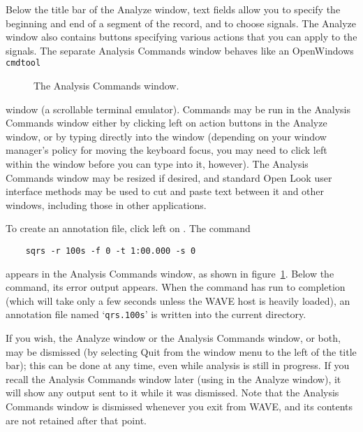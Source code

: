 \documentclass[twoside]{book}
\newcommand{\button}[1]{\cornersize{2}\ovalbox{\rule[-.3mm]{0cm}{2.5mm}\small\sf ~#1~}}
\newcommand{\WAVE}{{\sf WAVE}\xspace}
\begin{document}
Below the title bar of the {\sf Analyze} window, text fields allow you to
specify the beginning and end of a segment of the record, and to
choose signals.  The {\sf Analyze} window also contains buttons specifying
various actions that you can apply to the signals.  The separate
{\sf Analysis Commands} window behaves like an OpenWindows {\tt cmdtool}
\begin{figure}
\centerline{}
\caption{The {\sf Analysis Commands} window.}
\begin{htmlonly}
\end{htmlonly}
\begin{latexonly}
\end{latexonly}
\label{fig:analysis-commands}
\end{figure}
window (a scrollable terminal emulator).  Commands may be run in the
{\sf Analysis Commands} window either by clicking left on action buttons
in the {\sf Analyze} window, or by typing directly into the window (depending
on your window manager's policy for moving the keyboard focus, you may
need to click left within the window before you can type into it,
however).  The {\sf Analysis Commands} window may be resized if desired, and
standard Open Look user interface methods may be used to cut and paste
text between it and other windows, including those in other
applications.

To create an annotation file,
click left on \button{Mark QRS complexes}.
The command
\begin{verbatim}
    sqrs -r 100s -f 0 -t 1:00.000 -s 0
\end{verbatim}
appears in the {\sf Analysis Commands} window, as shown in
figure~\ref{fig:analysis-commands}.  Below the command, its error
output appears.  When the command has run to completion (which will take only
a few seconds unless the \WAVE{} host is heavily loaded), an annotation file
named `{\tt qrs.100s}' is written into the current directory.

If you wish, the {\sf Analyze} window or the {\sf Analysis Commands}
window, or both, may be dismissed (by selecting {\sf Quit} from the
window menu to the left of the title bar); this can be done at any
time, even while analysis is still in progress.  If you recall the
{\sf Analysis Commands} window later (using \button{Show command window}
in the {\sf Analyze} window), it will show any output sent to it
while it was dismissed.  Note that the {\sf Analysis Commands} window is
dismissed whenever you exit from \WAVE{}, and its contents are not
retained after that point.
\end{document}
